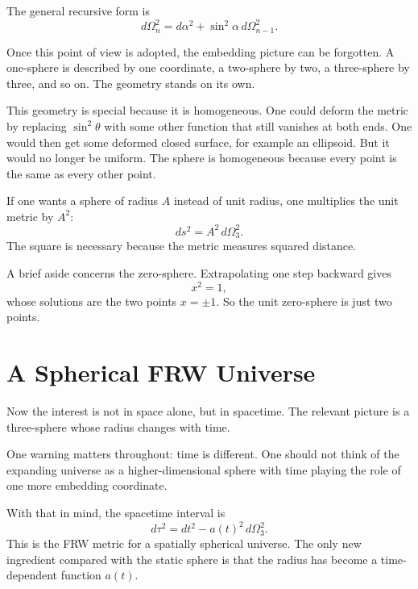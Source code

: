 The general recursive form is
\begin{equation}
d\Omega_n^2=d\alpha^2+\sin^2\alpha\,d\Omega_{n-1}^2.
\end{equation}

Once this point of view is adopted, the embedding picture can be forgotten. A one-sphere is described by one coordinate, a two-sphere by two, a three-sphere by three, and so on. The geometry stands on its own.

This geometry is special because it is homogeneous. One could deform the metric by replacing \(\sin^2\theta\) with some other function that still vanishes at both ends. One would then get some deformed closed surface, for example an ellipsoid. But it would no longer be uniform. The sphere is homogeneous because every point is the same as every other point.

If one wants a sphere of radius \(A\) instead of unit radius, one multiplies the unit metric by \(A^2\):
\begin{equation}
ds^2=A^2\,d\Omega_3^2.
\end{equation}
The square is necessary because the metric measures squared distance.

A brief aside concerns the zero-sphere. Extrapolating one step backward gives
\begin{equation}
x^2=1,
\end{equation}
whose solutions are the two points \(x=\pm 1\). So the unit zero-sphere is just two points.

\section{A Spherical FRW Universe}

Now the interest is not in space alone, but in spacetime. The relevant picture is a three-sphere whose radius changes with time.

One warning matters throughout: time is different. One should not think of the expanding universe as a higher-dimensional sphere with time playing the role of one more embedding coordinate.

With that in mind, the spacetime interval is
\begin{equation}
d\tau^2=dt^2-a(t)^2\,d\Omega_3^2.
\end{equation}
This is the FRW metric for a spatially spherical universe. The only new ingredient compared with the static sphere is that the radius has become a time-dependent function \(a(t)\).

